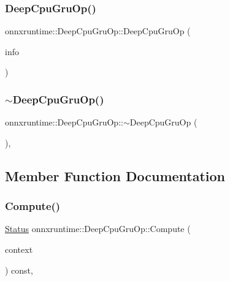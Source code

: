 \subsubsection{\texorpdfstring{Deep\+Cpu\+Gru\+Op()}{DeepCpuGruOp()}}
{\footnotesize\ttfamily onnxruntime\+::\+Deep\+Cpu\+Gru\+Op\+::\+Deep\+Cpu\+Gru\+Op (\begin{DoxyParamCaption}\item[{const \mbox{\hyperlink{classonnxruntime_1_1OpKernelInfo}{Op\+Kernel\+Info}} \&}]{info }\end{DoxyParamCaption})\hspace{0.3cm}{\ttfamily [inline]}}

\mbox{\label{classonnxruntime_1_1DeepCpuGruOp_a039a3bc8dbcdaad3d8ad3ed00cf4dcd6}} 
\subsubsection{\texorpdfstring{$\sim$\+Deep\+Cpu\+Gru\+Op()}{~DeepCpuGruOp()}}
{\footnotesize\ttfamily onnxruntime\+::\+Deep\+Cpu\+Gru\+Op\+::$\sim$\+Deep\+Cpu\+Gru\+Op (\begin{DoxyParamCaption}{ }\end{DoxyParamCaption})\hspace{0.3cm}{\ttfamily [override]}, {\ttfamily [default]}}



\subsection{Member Function Documentation}
\mbox{\label{classonnxruntime_1_1DeepCpuGruOp_a2a8b52f4c3e33f2633a18f2162bcf8fa}} 
\subsubsection{\texorpdfstring{Compute()}{Compute()}}
{\footnotesize\ttfamily \mbox{\hyperlink{classonnxruntime_1_1common_1_1Status}{Status}} onnxruntime\+::\+Deep\+Cpu\+Gru\+Op\+::\+Compute (\begin{DoxyParamCaption}\item[{\mbox{\hyperlink{classonnxruntime_1_1OpKernelContext}{Op\+Kernel\+Context}} $\ast$}]{context }\end{DoxyParamCaption}) const\hspace{0.3cm}{\ttfamily [override]}, {\ttfamily [virtual]}}



